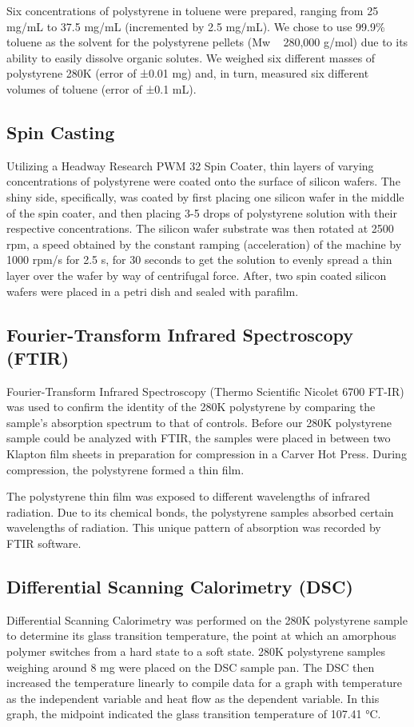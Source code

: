 \documentclass[twocolumn]{article}
\begin{document}
                Six concentrations of polystyrene in toluene were prepared, ranging from 25 mg/mL to 37.5 mg/mL (incremented by 2.5 mg/mL). We chose to use 99.9\% toluene as the solvent for the polystyrene pellets (Mw ~ 280,000 g/mol) due to its ability to easily dissolve organic solutes. We weighed six different masses of polystyrene 280K (error of ±0.01 mg) and, in turn, measured six different volumes of toluene (error of ±0.1 mL).

            \subsection{Spin Casting}
                Utilizing a Headway Research PWM 32 Spin Coater, thin layers of varying concentrations of polystyrene were coated onto the surface of silicon wafers. The shiny side, specifically, was coated by first placing one silicon wafer in the middle of the spin coater, and then placing 3­-5 drops of polystyrene solution with their respective concentrations. The silicon wafer substrate was then rotated at 2500 rpm, a speed obtained by the constant ramping (acceleration) of the machine by 1000 rpm/s for 2.5 s, for 30 seconds to get the solution to evenly spread a thin layer over the wafer by way of centrifugal force. After, two spin coated silicon wafers were placed in a petri dish and sealed with parafilm. 

            \subsection{Fourier-Transform Infrared Spectroscopy (FTIR)}
                Fourier-Transform Infrared Spectroscopy (Thermo Scientific Nicolet 6700 FT-IR) was used to confirm the identity of the 280K polystyrene by comparing the sample’s absorption spectrum to that of controls. Before our 280K polystyrene sample could be analyzed with FTIR, the samples were placed in between two Klapton film sheets in preparation for compression in a Carver Hot Press. During compression, the polystyrene formed a thin film. 

                The polystyrene thin film was exposed to different wavelengths of infrared radiation. Due to its chemical bonds, the polystyrene samples absorbed certain wavelengths of radiation. This unique pattern of absorption was recorded by FTIR software.

            \subsection{Differential Scanning Calorimetry (DSC)}
                Differential Scanning Calorimetry was performed on the 280K polystyrene sample to determine its glass transition temperature, the point at which an amorphous polymer switches from a hard state to a soft state. 280K polystyrene samples weighing around 8 mg were placed on the DSC sample pan. The DSC then increased the temperature linearly to compile data for a graph with temperature as the independent variable and heat flow as the dependent variable. In this graph, the midpoint indicated the glass transition temperature of 107.41 °C.
\end{document}
